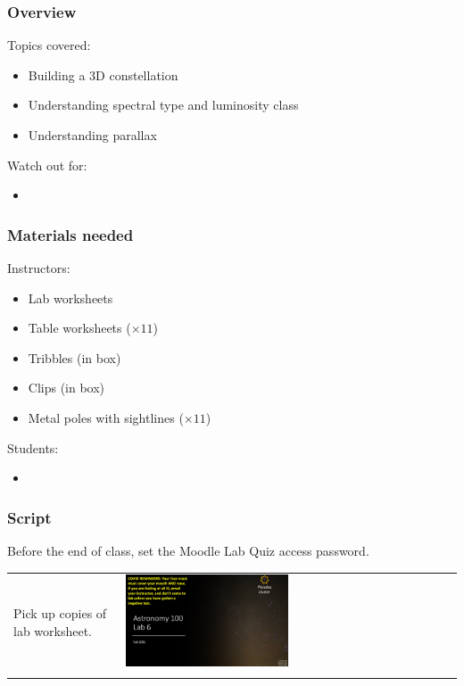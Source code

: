 \documentclass[12pt]{article}
\begin{document}
\subsubsection{Overview}

Topics covered:
\begin{itemize}
\item Building a 3D constellation
\item Understanding spectral type and luminosity class
\item Understanding parallax
\end{itemize}

\noindent
Watch out for:
\begin{itemize}
\item 
\end{itemize}


\subsubsection{Materials needed}

Instructors:
\begin{itemize}
\item Lab worksheets
\item Table worksheets ($\times 11$)
\item Tribbles (in box)
\item Clips (in box)
\item Metal poles with sightlines ($\times 11$)
\end{itemize}

\noindent
Students:
\begin{itemize}
\item 
\end{itemize}


\subsubsection{Script}

Before the end of class, set the Moodle Lab Quiz access password.

\begin{longtable}{m{}m{}}
Pick up copies of lab worksheet. & \includegraphics[width=0.5\textwidth]{ppt/lab10/Slide1.jpeg}\\

\label{default}
\end{longtable}
\end{document}
